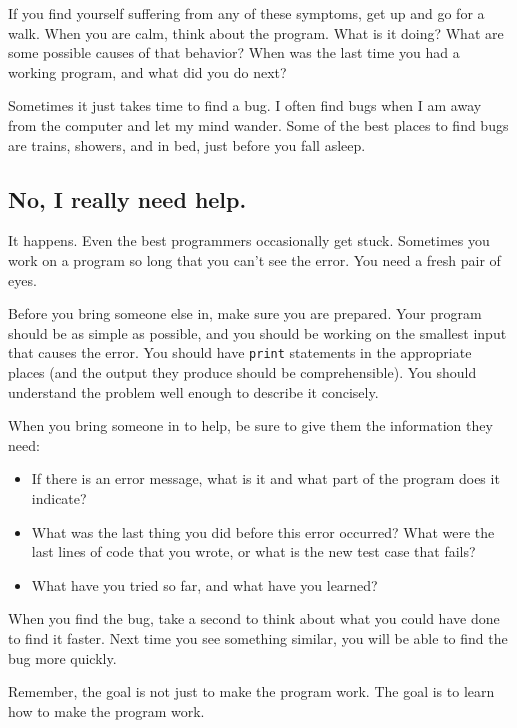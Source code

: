 If you find yourself suffering from any of these symptoms, get
up and go for a walk.  When you are calm, think about the program.
What is it doing?  What are some possible causes of that
behavior?  When was the last time you had a working program,
and what did you do next?

Sometimes it just takes time to find a bug.  I often find bugs
when I am away from the computer and let my mind wander.  Some
of the best places to find bugs are trains, showers, and in bed,
just before you fall asleep.


\subsection{No, I really need help.}

It happens.  Even the best programmers occasionally get stuck.
Sometimes you work on a program so long that you can't see the
error.  You need a fresh pair of eyes.

Before you bring someone else in, make sure you are prepared.
Your program should be as simple
as possible, and you should be working on the smallest input
that causes the error.  You should have {\tt print} statements in the
appropriate places (and the output they produce should be
comprehensible).  You should understand the problem well enough
to describe it concisely.

When you bring someone in to help, be sure to give
them the information they need:

\begin{itemize}

\item If there is an error message, what is it
and what part of the program does it indicate?

\item What was the last thing you did before this error occurred?
What were the last lines of code that you wrote, or what is
the new test case that fails?

\item What have you tried so far, and what have you learned?

\end{itemize}

When you find the bug, take a second to think about what you
could have done to find it faster.  Next time you see something
similar, you will be able to find the bug more quickly.

Remember, the goal is not just to make the program
work.  The goal is to learn how to make the program work.



